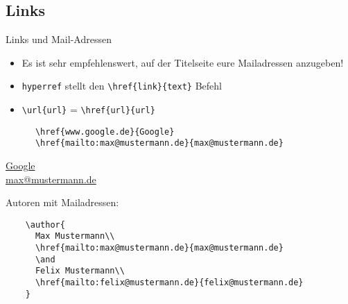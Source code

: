 \subsection{Links}

\begin{frame}[fragile]{Links und Mail-Adressen}
  \begin{itemize}
    \item Es ist sehr empfehlenswert, auf der Titelseite eure Mailadressen anzugeben!
    \item \texttt{hyperref} stellt den \lstinline+\href{link}{text}+ Befehl
    \item \lstinline+\url{url}+ = \lstinline+\href{url}{url}+
  \end{itemize}
  \begin{CodeExample}{0.5}
    \begin{lstlisting}
      \href{www.google.de}{Google}
      \href{mailto:max@mustermann.de}{max@mustermann.de}
    \end{lstlisting}
    \CodeResult
    \href{www.google.de}{Google}\\
    \href{mailto:max@mustermann.de}{max@mustermann.de}
  \end{CodeExample}
  \begin{block}{Autoren mit Mailadressen:}
    \begin{lstlisting}
    \author{
      Max Mustermann\\
      \href{mailto:max@mustermann.de}{max@mustermann.de}
      \and
      Felix Mustermann\\
      \href{mailto:felix@mustermann.de}{felix@mustermann.de}
    }
    \end{lstlisting}
  \end{block}
\end{frame}
